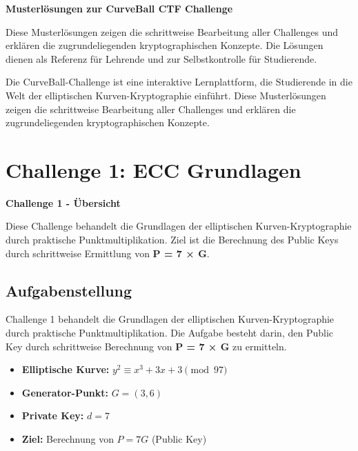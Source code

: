 \documentclass{article}
\begin{document}
\begin{infobox}
\textbf{Musterlösungen zur CurveBall CTF Challenge}

Diese Musterlösungen zeigen die schrittweise Bearbeitung aller Challenges und erklären die zugrundeliegenden kryptographischen Konzepte. Die Lösungen dienen als Referenz für Lehrende und zur Selbstkontrolle für Studierende.
\end{infobox}

Die CurveBall-Challenge ist eine interaktive Lernplattform, die Studierende in die Welt der elliptischen Kurven-Kryptographie einführt. Diese Musterlösungen zeigen die schrittweise Bearbeitung aller Challenges und erklären die zugrundeliegenden kryptographischen Konzepte.

\vspace{0.5cm}

\section{Challenge 1: ECC Grundlagen}

\begin{solutionbox}
\textbf{Challenge 1 - Übersicht}

Diese Challenge behandelt die Grundlagen der elliptischen Kurven-Kryptographie durch praktische Punktmultiplikation. Ziel ist die Berechnung des Public Keys durch schrittweise Ermittlung von \textbf{P = 7 × G}.
\end{solutionbox}

\subsection{Aufgabenstellung}
Challenge 1 behandelt die Grundlagen der elliptischen Kurven-Kryptographie durch praktische Punktmultiplikation. Die Aufgabe besteht darin, den Public Key durch schrittweise Berechnung von \textbf{P = 7 × G} zu ermitteln.

\begin{tcolorbox}[colback=thd-blue!10,colframe=thd-blue,title=\textbf{Gegebene Parameter}]
\begin{itemize}[leftmargin=1.5cm]
    \item \textbf{Elliptische Kurve:} $y^2 \equiv x^3 + 3x + 3 \pmod{97}$
    \item \textbf{Generator-Punkt:} $G = (3, 6)$
    \item \textbf{Private Key:} $d = 7$
    \item \textbf{Ziel:} Berechnung von $P = 7G$ (Public Key)
\end{itemize}
\end{tcolorbox}
\end{document}
